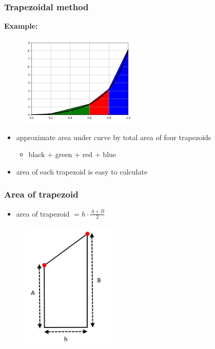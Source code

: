\documentclass[english,14pt]{beamer}
\newcommand\red[1]{{\color{red} #1}}
\newcommand\blue[1]{{\color{blue} #1}}
\newcommand\darkGreen[1]{{\color{darkGreen} #1}}
\begin{document}
\begin{frame}[fragile]

\frametitle{Trapezoidal method}

\textbf{Example:}
\vspace*{-5mm}
\begin{figure}[ht]
	\centering
	\includegraphics[width=0.5\textwidth]{figures/fourPanel}
\end{figure}
\vspace*{-3mm}
\begin{itemize}
	\item approximate area under curve by total area of four trapezoids
	\begin{itemize}
		\item black + \darkGreen{green} + \red{red} + \blue{blue}
	\end{itemize}
	\item area of each trapezoid is easy to calculate
\end{itemize}

\end{frame}


\begin{frame}[fragile]

\frametitle{Area of trapezoid}

\begin{itemize}
	\item area of trapezoid $= h\cdot\frac{A+B}{2}$
\end{itemize}
\vspace*{-3mm}
\begin{figure}[ht]
	\centering
	\includegraphics[width=0.4\textwidth]{figures/trapezoidArea}
\end{figure}

\end{frame}
\end{document}
